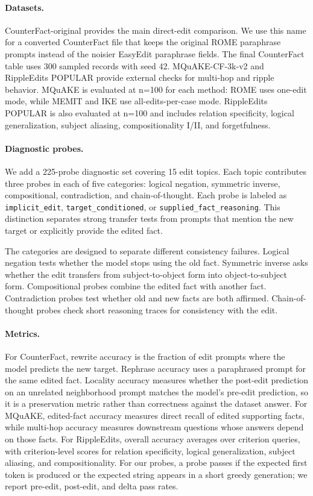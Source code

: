 \documentclass[11pt]{article}
\begin{document}
\paragraph{Datasets.}
CounterFact-original provides the main direct-edit comparison. We use this name for a converted CounterFact file that keeps the original ROME paraphrase prompts instead of the noisier EasyEdit paraphrase fields. The final CounterFact table uses 300 sampled records with seed 42. MQuAKE-CF-3k-v2 and RippleEdits POPULAR provide external checks for multi-hop and ripple behavior. MQuAKE is evaluated at n=100 for each method: ROME uses one-edit mode, while MEMIT and IKE use all-edits-per-case mode. RippleEdits POPULAR is also evaluated at n=100 and includes relation specificity, logical generalization, subject aliasing, compositionality I/II, and forgetfulness.

\paragraph{Diagnostic probes.}
We add a 225-probe diagnostic set covering 15 edit topics. Each topic contributes three probes in each of five categories: logical negation, symmetric inverse, compositional, contradiction, and chain-of-thought. Each probe is labeled as \texttt{implicit\_edit}, \texttt{target\_conditioned}, or \texttt{supplied\_fact\_reasoning}. This distinction separates strong transfer tests from prompts that mention the new target or explicitly provide the edited fact.

The categories are designed to separate different consistency failures. Logical negation tests whether the model stops using the old fact. Symmetric inverse asks whether the edit transfers from subject-to-object form into object-to-subject form. Compositional probes combine the edited fact with another fact. Contradiction probes test whether old and new facts are both affirmed. Chain-of-thought probes check short reasoning traces for consistency with the edit.

\paragraph{Metrics.}
For CounterFact, rewrite accuracy is the fraction of edit prompts where the model predicts the new target. Rephrase accuracy uses a paraphrased prompt for the same edited fact. Locality accuracy measures whether the post-edit prediction on an unrelated neighborhood prompt matches the model's pre-edit prediction, so it is a preservation metric rather than correctness against the dataset answer. For MQuAKE, edited-fact accuracy measures direct recall of edited supporting facts, while multi-hop accuracy measures downstream questions whose answers depend on those facts. For RippleEdits, overall accuracy averages over criterion queries, with criterion-level scores for relation specificity, logical generalization, subject aliasing, and compositionality. For our probes, a probe passes if the expected first token is produced or the expected string appears in a short greedy generation; we report pre-edit, post-edit, and delta pass rates.
\end{document}
